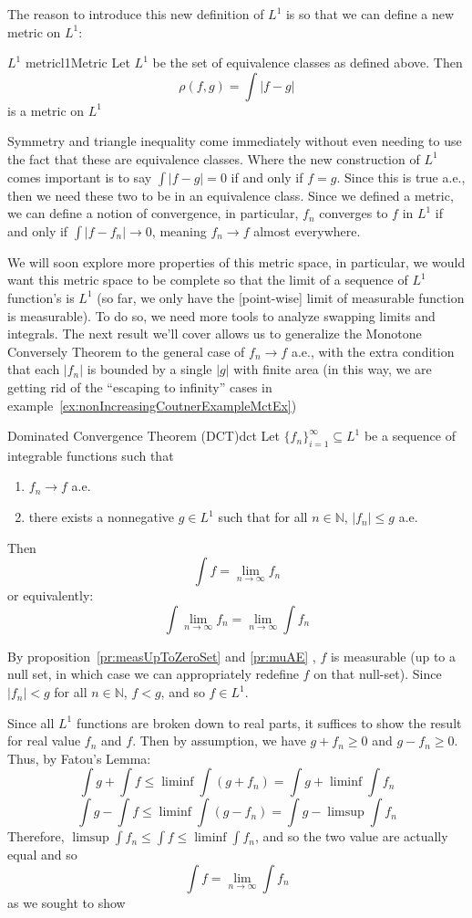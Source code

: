 \documentclass[oneside]{book}
\newcommand{\N}{\mathbb{N}}
\newcommand{\sse}{\subseteq}
\newcommand{\rw}{\rightarrow}
\begin{document}
The reason to introduce this new definition of $L^1$ is so that we can define a new metric on $L^1$:

\begin{defn}{$L^1$ metric}{l1Metric}
	Let $L^1$ be the set of equivalence classes as defined above. Then
	\[
		\rho(f,g) = \int |f-g|
	\]
	is a metric on $L^1$
\end{defn}

Symmetry and triangle inequality come immediately without even needing to use the fact that these are equivalence
classes. Where the new construction of $L^1$ comes important is to say $\int |f-g| = 0$ if and only if $f = g$. Since
this is true a.e., then we need these two to be in an equivalence class.  Since we defined a metric, we can define
a notion of convergence, in particular, $f_n$ converges to $f$ in $L^1$ if and only if $\int|f - f_n| \rw 0$, meaning
$f_n \rw f$ almost everywhere. 


We will soon explore more properties of this metric space, in particular, we would want this metric space to be complete
so that the limit of a sequence of $L^1$ function's is $L^1$ (so far, we only have the [point-wise] limit of measurable
function is measurable). To do so, we need more tools to analyze swapping limits and
integrals. The next result we'll cover allows us to generalize the Monotone Conversely Theorem to the general case of $f_n \rw f$
a.e., with the extra condition that each $|f_n|$ is bounded by a single $|g|$ with finite area (in this way, we are
getting rid of the ``escaping to infinity'' cases in example~\ref{ex:nonIncreasingCoutnerExampleMctEx})

\begin{thm}{Dominated Convergence Theorem (DCT)}{dct}
	Let $\{f_n\}_{i=1}^\infty \sse L^1$ be a sequence of integrable functions such that
	\begin{enumerate}
		\item $f_n \rw f$ a.e.
		\item there exists a nonnegative $g \in L^1$ such that for all $n \in \N$, $|f_n| \le g$ a.e. 
	\end{enumerate}
	Then 
	\[
		\int f = \lim_{n \rw \infty} f_n
	\]
	or equivalently:
	\[
		\int \lim_{n \rw \infty}f_n = \lim_{n \rw \infty} \int f_n
	\]
\end{thm}

\begin{Proof}
	By proposition~\ref{pr:measUpToZeroSet} and \ref{pr:muAE} , $f$ is measurable (up to a null set, in which case we
	can appropriately redefine $f$ on that null-set). Since $|f_n| < g$ for all $n \in \N$, $f < g$, and so $f \in L^1$. 

	Since all $L^1$ functions are broken down to real parts, it suffices to show the result for real value $f_n$ and
	$f$. Then by assumption, we have $g + f_n \ge 0$ and $g - f_n \ge 0$. Thus, by Fatou's Lemma:
	\[
		\int g + \int f \le \liminf \int (g + f_n) = \int g + \liminf \int f_n
	\]
	\[
		\int g - \int f \le \liminf \int (g - f_n) = \int g - \limsup \int f_n
	\]
	Therefore, $\limsup \int f_n \le \int f \le \liminf \int f_n$, and so the two value are actually equal and so 
	\[
		\int f = \lim_{n \rw \infty} \int f_n
	\]
	as we sought to show
\end{Proof}
\end{document}
